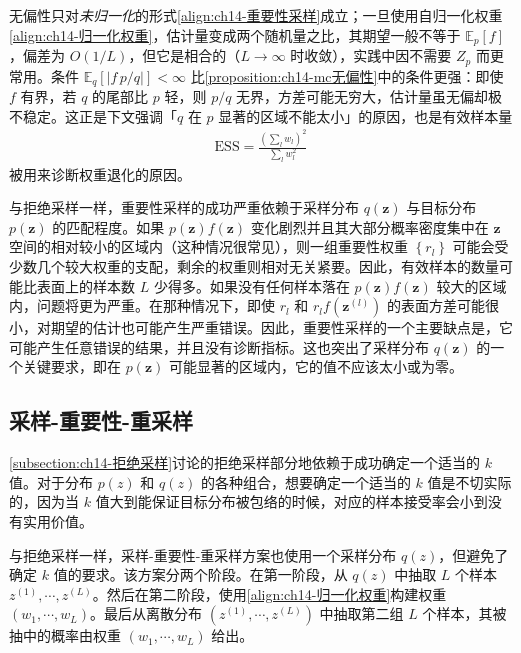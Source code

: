 \documentclass[../../main.tex]{subfiles}
\begin{document}
\begin{remark}无偏性只对\emph{未归一化}的形式\eqref{align:ch14-重要性采样}成立；一旦使用自归一化权重\eqref{align:ch14-归一化权重}，估计量变成两个随机量之比，其期望一般不等于 $\mathbb{E}_{p}[f]$，偏差为 $O(1/L)$，但它是相合的（$L\to\infty$ 时收敛），实践中因不需要 $Z_{p}$ 而更常用。条件 $\mathbb{E}_{q}\left[\left|f\,p/q\right|\right]<\infty$ 比\cref{proposition:ch14-mc无偏性}中的条件更强：即使 $f$ 有界，若 $q$ 的尾部比 $p$ 轻，则 $p/q$ 无界，方差可能无穷大，估计量虽无偏却极不稳定。这正是下文强调「$q$ 在 $p$ 显著的区域不能太小」的原因，也是有效样本量
\begin{align*}
\mathrm{ESS}=\frac{\left(\sum_{l}w_{l}\right)^{2}}{\sum_{l}w_{l}^{2}}
\end{align*}
被用来诊断权重退化的原因。
\end{remark}

与拒绝采样一样，重要性采样的成功严重依赖于采样分布 $q(\bm{z})$ 与目标分布 $p(\bm{z})$ 的匹配程度。如果 $p(\bm{z})f(\bm{z})$ 变化剧烈并且其大部分概率密度集中在 $\bm{z}$ 空间的相对较小的区域内（这种情况很常见），则一组重要性权重 $\left\{r_{l}\right\}$ 可能会受少数几个较大权重的支配，剩余的权重则相对无关紧要。因此，有效样本的数量可能比表面上的样本数 $L$ 少得多。如果没有任何样本落在 $p(\bm{z})f(\bm{z})$ 较大的区域内，问题将更为严重。在那种情况下，即使 $r_{l}$ 和 $r_{l}f\!\left(\bm{z}^{(l)}\right)$ 的表面方差可能很小，对期望的估计也可能产生严重错误。因此，重要性采样的一个主要缺点是，它可能产生任意错误的结果，并且没有诊断指标。这也突出了采样分布 $q(\bm{z})$ 的一个关键要求，即在 $p(\bm{z})$ 可能显著的区域内，它的值不应该太小或为零。

\subsection{采样-重要性-重采样}\label{subsection:ch14-采样重要性重采样}

\cref{subsection:ch14-拒绝采样}讨论的拒绝采样部分地依赖于成功确定一个适当的 $k$ 值。对于分布 $p(z)$ 和 $q(z)$ 的各种组合，想要确定一个适当的 $k$ 值是不切实际的，因为当 $k$ 值大到能保证目标分布被包络的时候，对应的样本接受率会小到没有实用价值。

与拒绝采样一样，采样-重要性-重采样方案也使用一个采样分布 $q(z)$，但避免了确定 $k$ 值的要求。该方案分两个阶段。在第一阶段，从 $q(z)$ 中抽取 $L$ 个样本 $z^{(1)},\cdots,z^{(L)}$。然后在第二阶段，使用\eqref{align:ch14-归一化权重}构建权重 $\left(w_{1},\cdots,w_{L}\right)$。最后从离散分布 $\left(z^{(1)},\cdots,z^{(L)}\right)$ 中抽取第二组 $L$ 个样本，其被抽中的概率由权重 $\left(w_{1},\cdots,w_{L}\right)$ 给出。
\end{document}
